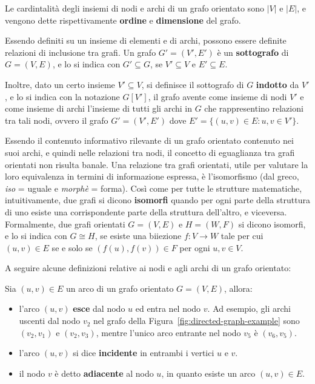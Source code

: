 Le cardintalit\`a degli insiemi di nodi e archi di un grafo orientato sono $|V|$ e $|E|$,
e vengono dette rispettivamente \textbf{ordine} e \textbf{dimensione} del grafo.

Essendo definiti su un insieme di elementi e di archi, possono essere definite relazioni di inclusione tra grafi.
Un grafo $G' = (V', E')$ \`e un \textbf{sottografo} di $G = (V, E)$, e lo si indica con $G' \subseteq G$, se $V' \subseteq V$
e $E' \subseteq E$.

Inoltre, dato un certo insieme $V' \subseteq V$, si definisce il sottografo di $G$ \textbf{indotto}
da $V'$, e lo si indica con la notazione $G[V']$, il grafo avente come insieme di nodi $V'$ e come insieme di archi
l'insieme di tutti gli archi in $G$ che rappresentino relazioni tra tali nodi, ovvero il grafo $G' = (V', E')$ dove
$E' = \{ (u, v) \in E : u, v \in V'\}$.

Essendo il contenuto informativo rilevante di un grafo orientato contenuto nei suoi archi, e quindi nelle relazioni
tra nodi, il concetto di eguaglianza tra grafi orientati non risulta banale.
Una relazione tra grafi orientati, utile per valutare la loro equivalenza in termini di informazione espressa,
\`e l'isomorfismo (dal greco, \textit{iso} = uguale e \textit{morph\`e} = forma).
Così come per tutte le strutture matematiche, intuitivamente, due grafi si dicono \textbf{isomorfi} quando per ogni
parte della struttura di uno esiste una corrispondente parte della struttura dell'altro, e viceversa.
Formalmente, due grafi orientati $G = (V, E)$ e $H = (W, F)$ si dicono isomorfi, e lo si indica con $G \cong H$, se
esiste una biiezione $f: V \rightarrow W$ tale per cui $(u, v) \in E$ se e solo se $(f(u), f(v)) \in F$ per ogni
$u, v \in V$.

\label{par:archi-e-nodi-di-un-grafo-orientato}

A seguire alcune definizioni relative ai nodi e agli archi di un grafo orientato: \newline

Sia $(u, v) \in E$ un arco di un grafo orientato $G = (V, E)$, allora:
\begin{itemize}
    \item l'arco $(u, v)$ \textbf{esce} dal nodo $u$ ed {entra} nel nodo $v$.
        Ad esempio, gli archi uscenti dal nodo $v_2$ nel grafo della Figura~\ref{fig:directed-graph-example}
        sono $(v_2, v_1)$ e $(v_2, v_3)$, mentre l'unico arco entrante nel nodo $v_5$ \`e $(v_6, v_5)$.
    \item l'arco $(u, v)$ si dice \textbf{incidente} in entrambi i vertici $u$ e $v$.
    \item il nodo $v$ \`e detto \textbf{adiacente} al nodo $u$, in quanto esiste un arco $(u, v) \in E$.
\end{itemize}


